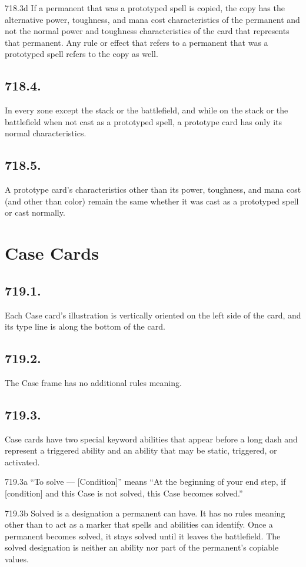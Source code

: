 718.3d If a permanent that was a prototyped spell is copied, the copy has the alternative power, toughness, and mana cost characteristics of the permanent and not the normal power and toughness characteristics of the card that represents that permanent. Any rule or effect that refers to a permanent that was a prototyped spell refers to the copy as well.

\subsection*{718.4.}
In every zone except the stack or the battlefield, and while on the stack or the battlefield when not cast as a prototyped spell, a prototype card has only its normal characteristics.

\subsection*{718.5.}
A prototype card’s characteristics other than its power, toughness, and mana cost (and other than color) remain the same whether it was cast as a prototyped spell or cast normally.

\section{Case Cards}
\subsection*{719.1.}
Each Case card’s illustration is vertically oriented on the left side of the card, and its type line is along the bottom of the card.

\subsection*{719.2.}
The Case frame has no additional rules meaning.

\subsection*{719.3.}
Case cards have two special keyword abilities that appear before a long dash and represent a triggered ability and an ability that may be static, triggered, or activated.

719.3a “To solve — [Condition]” means “At the beginning of your end step, if [condition] and this Case is not solved, this Case becomes solved.”

719.3b Solved is a designation a permanent can have. It has no rules meaning other than to act as a marker that spells and abilities can identify. Once a permanent becomes solved, it stays solved until it leaves the battlefield. The solved designation is neither an ability nor part of the permanent’s copiable values.


